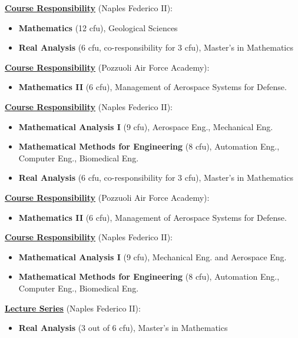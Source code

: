 \documentclass[11pt,a4paper,sans,colorlinks,linkcolor=green]{moderncv}
\begin{document}
{\textbf{\underline{Course Responsibility}} (Naples Federico II):
  \begin{itemize}
  \item[$\textcolor{color1}{\circ}$]  \textbf{Mathematics} (12 cfu),
     Geological Sciences
\item[$\textcolor{color1}{\circ}$] \textbf{Real Analysis} (6 cfu, co-responsibility for 3 cfu), Master's in Mathematics
\end{itemize}
   \vspace{-.6cm}\phantom{x}
}
\cvitem{}
{\textbf{\underline{Course Responsibility}} (Pozzuoli Air Force Academy):
  \begin{itemize}
  \item[$\textcolor{color1}{\circ}$]  \textbf{Mathematics II} (6 cfu),
     Management of Aerospace Systems for Defense.
\end{itemize}
   \vspace{-.6cm}\phantom{x}
}
{\textbf{\underline{Course Responsibility}} (Naples Federico II):
  \begin{itemize}
  \item[$\textcolor{color1}{\circ}$]  \textbf{Mathematical Analysis I} (9 cfu),
     Aerospace Eng., Mechanical Eng.
    \item[$\textcolor{color1}{\circ}$]  \textbf{Mathematical Methods for Engineering} (8 cfu), Automation Eng., Computer Eng., Biomedical Eng.
        \item[$\textcolor{color1}{\circ}$] \textbf{Real Analysis} (6 cfu, co-responsibility for 3 cfu), Master's in Mathematics
\end{itemize}
   \vspace{-.6cm}\phantom{x}
}
\cvitem{}
{\textbf{\underline{Course Responsibility}} (Pozzuoli Air Force Academy):
  \begin{itemize}
  \item[$\textcolor{color1}{\circ}$]  \textbf{Mathematics II} (6 cfu),
     Management of Aerospace Systems for Defense.
\end{itemize}
   \vspace{-.6cm}\phantom{x}
}

{
\textbf{\underline{Course Responsibility}} (Naples Federico II):
  \begin{itemize} \item \textbf{Mathematical Analysis I} (9 cfu),
     Mechanical Eng. and Aerospace Eng.
    \item  \textbf{Mathematical Methods for Engineering} (8 cfu),  Automation Eng., Computer Eng., Biomedical Eng.
\end{itemize}
      \vspace{-.05cm}
\textbf{\underline{Lecture Series}} (Naples Federico II):
\begin{itemize}
        \item \textbf{Real Analysis} (3 out of 6 cfu), Master's in Mathematics %
\end{itemize}
   \vspace{-.6cm}\phantom{x}
}
\end{document}
